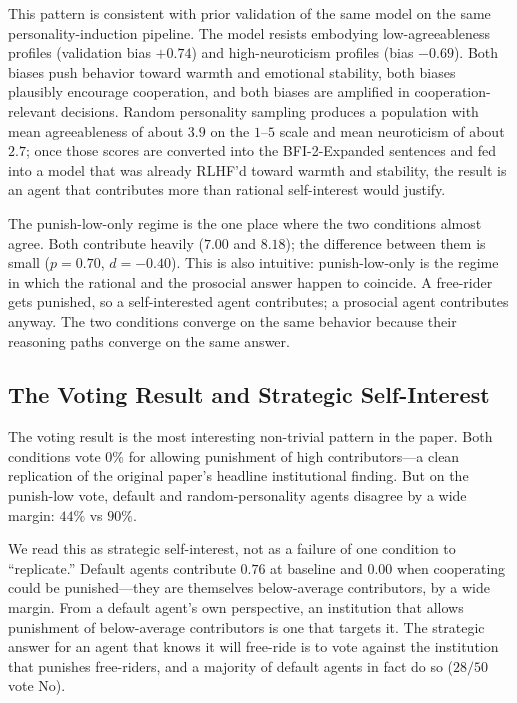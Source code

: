 \documentclass[12pt, a4paper]{article}
\begin{document}
This pattern is consistent with prior validation of the same model on the same personality-induction pipeline. The model resists embodying low-agreeableness profiles (validation bias $+0.74$) and high-neuroticism profiles (bias $-0.69$). Both biases push behavior toward warmth and emotional stability, both biases plausibly encourage cooperation, and both biases are amplified in cooperation-relevant decisions. Random personality sampling produces a population with mean agreeableness of about $3.9$ on the $1$--$5$ scale and mean neuroticism of about $2.7$; once those scores are converted into the BFI-2-Expanded sentences and fed into a model that was already RLHF'd toward warmth and stability, the result is an agent that contributes more than rational self-interest would justify.

The punish-low-only regime is the one place where the two conditions almost agree. Both contribute heavily ($7.00$ and $8.18$); the difference between them is small ($p=0.70$, $d=-0.40$). This is also intuitive: punish-low-only is the regime in which the rational and the prosocial answer happen to coincide. A free-rider gets punished, so a self-interested agent contributes; a prosocial agent contributes anyway. The two conditions converge on the same behavior because their reasoning paths converge on the same answer.

\subsection{The Voting Result and Strategic Self-Interest}
\label{sec:discussion-voting}

The voting result is the most interesting non-trivial pattern in the paper. Both conditions vote $0\%$ for allowing punishment of high contributors---a clean replication of the original paper's headline institutional finding. But on the punish-low vote, default and random-personality agents disagree by a wide margin: $44\%$ vs $90\%$.

We read this as strategic self-interest, not as a failure of one condition to ``replicate.'' Default agents contribute $0.76$ at baseline and $0.00$ when cooperating could be punished---they are themselves below-average contributors, by a wide margin. From a default agent's own perspective, an institution that allows punishment of below-average contributors is one that targets it. The strategic answer for an agent that knows it will free-ride is to vote against the institution that punishes free-riders, and a majority of default agents in fact do so ($28/50$ vote No).
\end{document}
